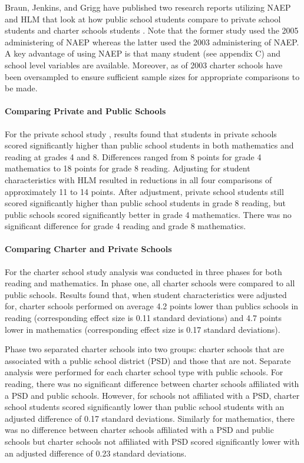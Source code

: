 \documentclass[letterpaper,12p,twoside]{article} %
\begin{document}
Braun, Jenkins, and Grigg have published two research reports utilizing NAEP and HLM that look at how public school students compare to private school students \citeyear{braun2006private} and charter schools students \citeyear{braun06hlm}. Note that the former study used the 2005 administering of NAEP whereas the latter used the 2003 administering of NAEP. A key advantage of using NAEP is that many student (see appendix C) and school level variables are available. Moreover, as of 2003 charter schools have been oversampled to ensure sufficient sample sizes for appropriate comparisons to be made. 

\paragraph{Comparing Private and Public Schools}
For the private school study \cite{braun2006private}, results found that students in private schools scored significantly higher than public school students in both mathematics and reading at grades 4 and 8. Differences ranged from 8 points for grade 4 mathematics to 18 points for grade 8 reading. Adjusting for student characteristics with HLM resulted in reductions in all four comparisons of approximately 11 to 14 points. After adjustment, private school students still scored significantly higher than public school students in grade 8 reading, but public schools scored significantly better in grade 4 mathematics. There was no significant difference for grade 4 reading and grade 8 mathematics.

\paragraph{Comparing Charter and Private Schools}
For the charter school study \cite{braun06hlm} analysis was conducted in three phases for both reading and mathematics. In phase one, all charter schools were compared to all public schools. Results found that, when student characteristics were adjusted for, charter schools performed on average 4.2 points lower than publics schools in reading (corresponding effect size is 0.11 standard deviations) and 4.7 points lower in mathematics (corresponding effect size is 0.17 standard deviations). 

Phase two separated charter schools into two groups: charter schools that are associated with a public school district (PSD) and those that are not. Separate analysis were performed for each charter school type with public schools. For reading, there was no significant difference between charter schools affiliated with a PSD and public schools. However, for schools not affiliated with a PSD, charter school students scored significantly lower than public school students with an adjusted difference of 0.17 standard deviations. Similarly for mathematics, there was no difference between charter schools affiliated with a PSD and public schools but charter schools not affiliated with PSD scored significantly lower with an adjusted difference of 0.23 standard deviations.
\end{document}
